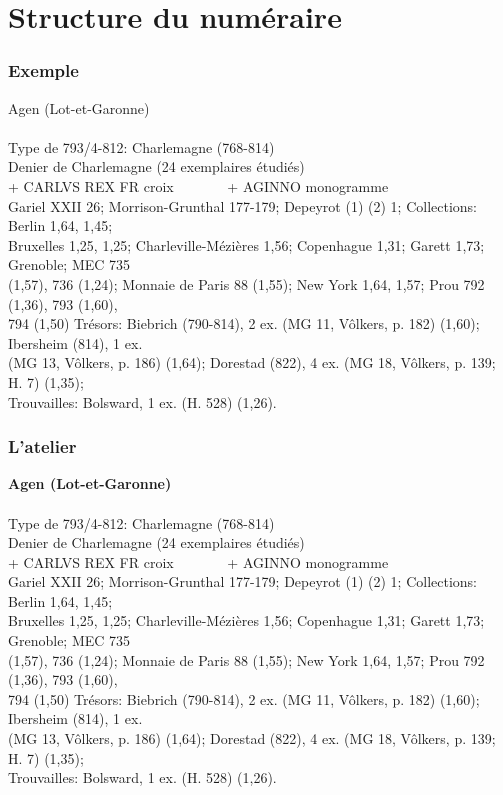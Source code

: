 \documentclass[10pt, compress]{beamer}
\begin{document}
\section{Structure du numéraire}
\begin{frame}[fragile]
\frametitle{Exemple}
\begin{scriptsize}
Agen (Lot-et-Garonne)\\~\\

Type de 793/4-812: Charlemagne (768-814)\\
Denier de Charlemagne (24 exemplaires étudiés)\\
+ CARLVS REX FR croix~~~~~~~ + AGINNO monogramme\\
Gariel XXII 26; Morrison-Grunthal 177-179; Depeyrot (1) (2) 1; Collections: Berlin 1,64, 1,45;\\
Bruxelles 1,25, 1,25; Charleville-Mézières 1,56; Copenhague 1,31; Garett 1,73; Grenoble; MEC 735 \\
(1,57), 736 (1,24); Monnaie de Paris 88 (1,55); New York 1,64, 1,57; Prou 792 (1,36), 793 (1,60), \\
794 (1,50) Trésors: Biebrich (790-814), 2 ex. (MG 11, Vôlkers, p. 182) (1,60); Ibersheim (814), 1 ex. \\
(MG 13, Vôlkers, p. 186) (1,64); Dorestad (822), 4 ex. (MG 18, Vôlkers, p. 139; H. 7) (1,35);\\
Trouvailles: Bolsward, 1 ex. (H. 528) (1,26).
\end{scriptsize}
\end{frame}

\begin{frame}[fragile]
  \frametitle{L'atelier}
  \begin{scriptsize}
\textbf{Agen (Lot-et-Garonne)}\\~\\
\textcolor{light_gray}{
Type de 793/4-812: Charlemagne (768-814)\\
Denier de Charlemagne (24 exemplaires étudiés)\\
+ CARLVS REX FR croix~~~~~~~ + AGINNO monogramme\\
Gariel XXII 26; Morrison-Grunthal 177-179; Depeyrot (1) (2) 1; Collections: Berlin 1,64, 1,45; \\
Bruxelles 1,25, 1,25; Charleville-Mézières 1,56; Copenhague 1,31; Garett 1,73; Grenoble; MEC 735 \\
(1,57), 736 (1,24); Monnaie de Paris 88 (1,55); New York 1,64, 1,57; Prou 792 (1,36), 793 (1,60), \\
794 (1,50) Trésors: Biebrich (790-814), 2 ex. (MG 11, Vôlkers, p. 182) (1,60); Ibersheim (814), 1 ex. \\
(MG 13, Vôlkers, p. 186) (1,64); Dorestad (822), 4 ex. (MG 18, Vôlkers, p. 139; H. 7) (1,35); \\Trouvailles: Bolsward, 1 ex. (H. 528) (1,26).
} 
\end{scriptsize}
    
\end{frame}
\end{document}
